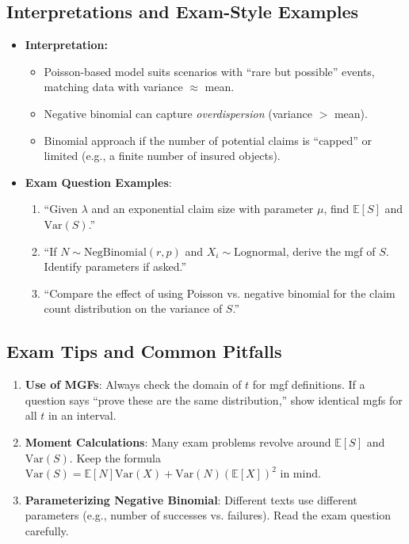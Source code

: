 \documentclass[13pt,a4paper]{article}
\begin{document}
\subsection{Interpretations and Exam-Style Examples}
\begin{itemize}
  \item \textbf{Interpretation:} 
    \begin{itemize}
      \item Poisson-based model suits scenarios with “rare but possible” events, matching data with variance \(\approx\) mean.
      \item Negative binomial can capture \emph{overdispersion} (variance $>$ mean).
      \item Binomial approach if the number of potential claims is “capped” or limited (e.g., a finite number of insured objects).
    \end{itemize}
  \item \textbf{Exam Question Examples}:
    \begin{enumerate}
      \item “Given \(\lambda\) and an exponential claim size with parameter \(\mu\), find \(\mathbb{E}[S]\) and \(\mathrm{Var}(S)\).”
      \item “If \(N\sim\text{NegBinomial}(r,p)\) and \(X_i\sim \text{Lognormal}\), derive the mgf of \(S\). Identify parameters if asked.”
      \item “Compare the effect of using Poisson vs. negative binomial for the claim count distribution on the variance of \(S\).”
    \end{enumerate}
\end{itemize}

\subsection{Exam Tips and Common Pitfalls}
\begin{enumerate}
  \item \textbf{Use of MGFs}: Always check the domain of \(t\) for mgf definitions. If a question says “prove these are the same distribution,” show identical mgfs for all \(t\) in an interval.
  \item \textbf{Moment Calculations}: Many exam problems revolve around 
    \(\mathbb{E}[S]\) and \(\mathrm{Var}(S)\). Keep the formula 
    \(\mathrm{Var}(S)=\mathbb{E}[N]\mathrm{Var}(X)+\mathrm{Var}(N)(\mathbb{E}[X])^2\) 
    in mind.
  \item \textbf{Parameterizing Negative Binomial}: Different texts use different parameters (e.g., number of successes vs. failures). Read the exam question carefully.
\end{enumerate}
\end{document}

